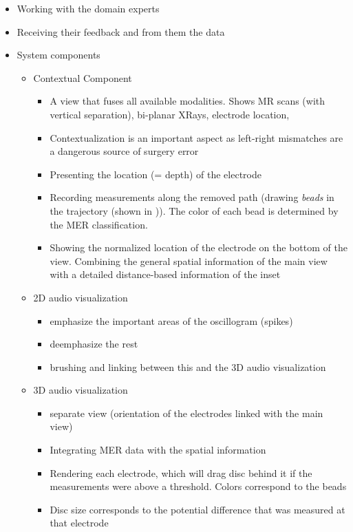 \begin{itemize}
\item Working with the domain experts
\item Receiving their feedback and from them the data
\item System components
\begin{itemize}
    \item Contextual Component
    \begin{itemize}
        \item A  view that fuses all available modalities. Shows MR scans (with vertical separation), bi-planar XRays, electrode location,
        \item Contextualization is an important aspect as left-right mismatches are a dangerous source of surgery error
        \item Presenting the location (= depth) of the electrode
        \item Recording measurements along the removed path (drawing \emph{beads} in the trajectory (shown in \cite{Haese2005} \cite{Miocinovic2007})). The color of each bead is determined by the MER classification.
        \item Showing the normalized location of the electrode on the bottom of the view. Combining the general spatial information of the main view with a detailed distance-based information of the inset
    \end{itemize}
    \item 2D audio visualization
    \begin{itemize}
        \item emphasize the important areas of the oscillogram (spikes)
        \item deemphasize the rest
        \item brushing and linking between this and the 3D audio visualization
    \end{itemize}
    \item 3D audio visualization
    \begin{itemize}
        \item separate view (orientation of the electrodes linked with the main view)
        \item Integrating MER data with the spatial information
        \item Rendering each electrode, which will drag disc behind it if the measurements were above a threshold. Colors correspond to the beads
        \item Disc size corresponds to the potential difference that was measured at that electrode

\end{itemize}
\end{itemize}
\end{itemize}
